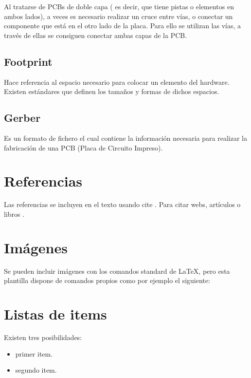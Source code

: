 Al tratarse de PCBs de doble capa ( es decir, que tiene pistas o elementos en ambos lados), a veces es necesario realizar un cruce entre vías, o conectar un componente que está en el otro lado de la placa. Para ello se utilizan las vías, a través de ellas se consiguen conectar ambas capas de la PCB.

\subsection{Footprint}\label{footprint}

Hace referencia al espacio necesario para colocar un elemento del hardware. Existen estándares que definen los tamaños y formas de dichos espacios.

\subsection{Gerber}\label{gerber}
Es un formato de fichero el cual contiene la información necesaria para realizar la fabricación de una PCB (Placa de Circuito Impreso).



\section{Referencias}

Las referencias se incluyen en el texto usando cite \cite{wiki:latex}. Para citar webs, artículos o libros \cite{koza92}.


\section{Imágenes}

Se pueden incluir imágenes con los comandos standard de \LaTeX, pero esta plantilla dispone de comandos propios como por ejemplo el siguiente:




\section{Listas de items}

Existen tres posibilidades:

\begin{itemize}
	\item primer item.
	\item segundo item.
\end{itemize}

